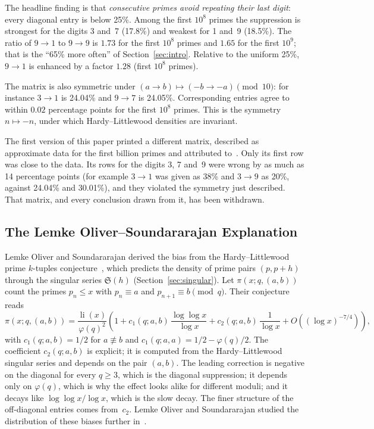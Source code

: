 \documentclass[12pt,a4paper]{article}
\theoremstyle{plain}
\theoremstyle{definition}
\theoremstyle{remark}
\begin{document}
The headline finding is that \emph{consecutive primes avoid repeating their last digit}:
every diagonal entry is below 25\%. Among the first $10^8$ primes the suppression is
strongest for the digits 3 and~7 (17.8\%) and weakest for 1 and~9 (18.5\%). The ratio
of $9 \to 1$ to $9 \to 9$ is $1.73$ for the first $10^8$ primes and $1.65$ for the first
$10^9$; that is the ``65\% more often'' of Section~\ref{sec:intro}. Relative to the uniform
25\%, $9 \to 1$ is enhanced by a factor $1.28$ (first $10^8$ primes).

The matrix is also symmetric under $(a \to b) \mapsto (-b \to -a) \pmod{10}$: for
instance $3 \to 1$ is 24.04\% and $9 \to 7$ is 24.05\%. Corresponding entries agree to
within $0.02$ percentage points for the first $10^8$ primes. This is the symmetry
$n \mapsto -n$, under which Hardy--Littlewood densities are invariant.

The first version of this paper printed a different matrix, described as approximate
data for the first billion primes and attributed to~\cite{LOS16}. Only its first row was
close to the data. Its rows for the digits 3, 7 and~9 were wrong by as much as 14
percentage points (for example $3 \to 1$ was given as 38\% and $3 \to 9$ as 20\%, against
24.04\% and 30.01\%), and they violated the symmetry just described. That matrix,
and every conclusion drawn from it, has been withdrawn.

\subsection{The Lemke Oliver--Soundararajan Explanation}

Lemke Oliver and Soundararajan derived the bias from the Hardy--Littlewood prime
$k$-tuples conjecture~\cite{HL23}, which predicts the density of prime pairs $(p, p+h)$
through the singular series $\mathfrak{S}(h)$ (Section~\ref{sec:singular}). Let
$\pi(x; q, (a,b))$ count the primes $p_n \leq x$ with $p_n \equiv a$ and
$p_{n+1} \equiv b \pmod q$. Their conjecture~\cite{LOS16} reads
\[
  \pi(x; q, (a,b)) = \frac{\operatorname{li}(x)}{\varphi(q)^2}
  \left(1 + c_1(q;a,b)\,\frac{\log\log x}{\log x}
  + c_2(q;a,b)\,\frac{1}{\log x}
  + O\!\left((\log x)^{-7/4}\right)\right),
\]
with $c_1(q;a,b) = 1/2$ for $a \not\equiv b$ and
$c_1(q;a,a) = 1/2 - \varphi(q)/2$. The coefficient $c_2(q;a,b)$ is explicit; it is
computed from the Hardy--Littlewood singular series and depends on the pair $(a,b)$. The
leading correction is negative on the diagonal for every $q \geq 3$, which is the diagonal
suppression; it depends only on $\varphi(q)$, which is why the effect looks alike for
different moduli; and it decays like $\log\log x/\log x$, which is the slow decay. The finer
structure of the off-diagonal entries comes from~$c_2$. Lemke Oliver and Soundararajan
studied the distribution of these biases further in~\cite{LOS17}.
\end{document}

